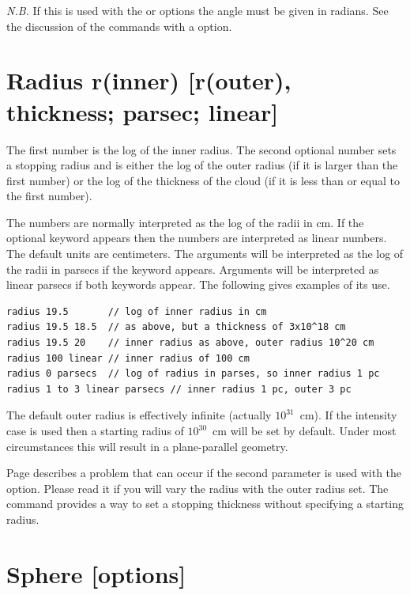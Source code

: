 \emph{N.B.}  If this is used with the  or
 options the angle must be given in radians.
See the discussion of the commands with a  option.

\section{Radius r(inner)  [r(outer), thickness; parsec; linear]}
\label{sec:RadiusCommand}

The first number is the log of the inner radius.
The second optional
number sets a stopping radius and is either the log of the
outer radius
(if it is larger than the first number) or the log of the thickness of the
cloud (if it is less than or equal to the first number).

The numbers are normally interpreted as the log of the radii in cm.
If the optional keyword  appears then
the numbers are interpreted
as linear numbers.
The default units are centimeters.
The arguments will
be interpreted as the log of the radii in parsecs if the keyword
 appears.
Arguments will be interpreted as linear parsecs if both keywords
appear.
The following gives examples of its use.
\begin{verbatim}
radius 19.5       // log of inner radius in cm
radius 19.5 18.5  // as above, but a thickness of 3x10^18 cm
radius 19.5 20    // inner radius as above, outer radius 10^20 cm
radius 100 linear // inner radius of 100 cm
radius 0 parsecs  // log of radius in parses, so inner radius 1 pc
radius 1 to 3 linear parsecs // inner radius 1 pc, outer 3 pc
\end{verbatim}

The default outer radius is effectively infinite (actually $10^{31}$~cm).
If the intensity case is used then a starting radius of $10^{30}$~cm
will be set by default.
Under most circumstances this will result in a
plane-parallel geometry.

Page \pageref{sec:RadiusVaryOptions} describes a problem
that can occur if the second parameter is used with the
 option.
Please read it if you will vary the radius
with the outer radius set.
The  command provides a way to set
a stopping thickness without specifying a starting radius.

\section{Sphere [options]}

